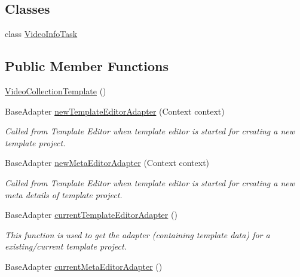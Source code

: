 \subsection*{Classes}
\begin{DoxyCompactItemize}
\item 
class \hyperlink{classorg_1_1buildmlearn_1_1toolkit_1_1templates_1_1VideoCollectionTemplate_1_1VideoInfoTask}{Video\+Info\+Task}
\end{DoxyCompactItemize}
\subsection*{Public Member Functions}
\begin{DoxyCompactItemize}
\item 
\hyperlink{classorg_1_1buildmlearn_1_1toolkit_1_1templates_1_1VideoCollectionTemplate_a5d233cecc9df8484f2c8599a7da4b840}{Video\+Collection\+Template} ()
\item 
Base\+Adapter \hyperlink{classorg_1_1buildmlearn_1_1toolkit_1_1templates_1_1VideoCollectionTemplate_a3e78c839b8a70c3dcd23a2e0f22e61b8}{new\+Template\+Editor\+Adapter} (Context context)
\begin{DoxyCompactList}\small\item\em Called from Template Editor when template editor is started for creating a new template project. \end{DoxyCompactList}\item 
Base\+Adapter \hyperlink{classorg_1_1buildmlearn_1_1toolkit_1_1templates_1_1VideoCollectionTemplate_a095228ca6c37e78c4344ae3d45536dfd}{new\+Meta\+Editor\+Adapter} (Context context)
\begin{DoxyCompactList}\small\item\em Called from Template Editor when template editor is started for creating a new meta details of template project. \end{DoxyCompactList}\item 
Base\+Adapter \hyperlink{classorg_1_1buildmlearn_1_1toolkit_1_1templates_1_1VideoCollectionTemplate_a31e46272b802389894cd9b4075116ab6}{current\+Template\+Editor\+Adapter} ()
\begin{DoxyCompactList}\small\item\em This function is used to get the adapter (containing template data) for a existing/current template project. \end{DoxyCompactList}\item 
Base\+Adapter \hyperlink{classorg_1_1buildmlearn_1_1toolkit_1_1templates_1_1VideoCollectionTemplate_aea2e51dcb356740a1f30639f0236a688}{current\+Meta\+Editor\+Adapter} ()

\end{DoxyCompactItemize}
